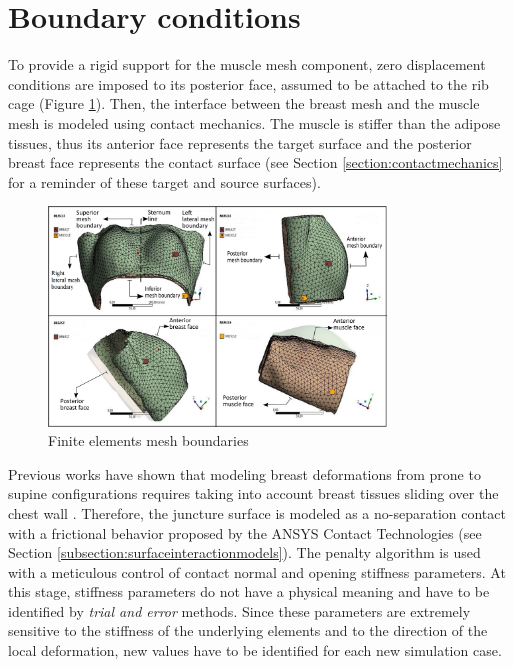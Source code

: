 \section{Boundary conditions}\label{section:myBoundayconditions}
To provide a rigid support for the muscle mesh component, zero displacement conditions are imposed to its posterior face, assumed to be attached to the rib cage (Figure \ref{fig:meshboundaries}). Then, the interface between the breast mesh and the muscle mesh is modeled using contact mechanics. The muscle is stiffer than the adipose tissues, thus its anterior face represents the target surface and the posterior breast face represents the contact surface (see Section \ref{section:contactmechanics} for a reminder of these target and source surfaces). 

\begin{figure}[!h]
\centering
\includegraphics[width=0.8\textwidth,keepaspectratio]{figures/mesh_parts_2.png} 
\caption{Finite elements mesh boundaries}\label{fig:meshboundaries}
\end{figure}

Previous works have shown that modeling breast deformations from prone to supine configurations requires taking into account breast tissues sliding over the chest wall \citep{carter_application_2012,han_nonlinear_2014}.  Therefore, the juncture surface is modeled as a no-separation contact with a frictional behavior proposed by the ANSYS Contact Technologies (see Section \ref{subsection:surfaceinteractionmodels}). The penalty algorithm is used with a meticulous control of contact normal and opening stiffness parameters. At this stage, stiffness parameters do not have a physical meaning and have to be identified by \textit{trial and error} methods. Since these parameters are extremely sensitive to the stiffness of the underlying elements and to the direction of the local deformation, new values have to be identified for each new simulation case.    


